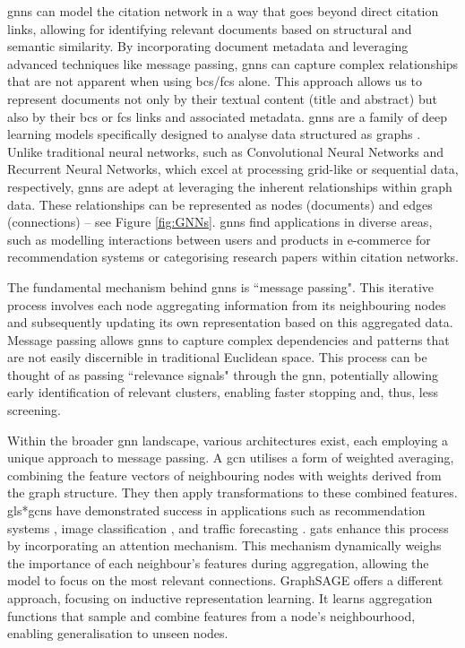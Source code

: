 \documentclass[10pt,oneside]{book}
\begin{document}
\gls*{gnn}s can model the citation network in a way that goes beyond direct citation links, allowing for identifying relevant documents based on structural and semantic similarity. By incorporating document metadata and leveraging advanced techniques like message passing, \gls*{gnn}s can capture complex relationships that are not apparent when using \gls*{bcs}/\gls*{fcs} alone. This approach allows us to represent documents not only by their textual content (title and abstract) but also by their \gls*{bcs} or \gls*{fcs} links and associated metadata. \gls*{gnn}s are a family of deep learning models specifically designed to analyse data structured as graphs \cite{lee_attention_2018, wu_comprehensive_2021, bronstein_geometric_2017, khemani_review_2024}. Unlike traditional neural networks, such as Convolutional Neural Networks and Recurrent Neural Networks, which excel at processing grid-like or sequential data, respectively, \gls*{gnn}s are adept at leveraging the inherent relationships within graph data. These relationships can be represented as nodes (documents) and edges (connections) – see Figure \ref{fig:GNNs}. \gls*{gnn}s find applications in diverse areas, such as modelling interactions between users and products in e-commerce for recommendation systems or categorising research papers within citation networks. 

The fundamental mechanism behind \gls*{gnn}s is ``message passing". This iterative process involves each node aggregating information from its neighbouring nodes and subsequently updating its own representation based on this aggregated data. Message passing allows \gls*{gnn}s to capture complex dependencies and patterns that are not easily discernible in traditional Euclidean space. This process can be thought of as passing ``relevance signals" through the \gls*{gnn}, potentially allowing early identification of relevant clusters, enabling faster stopping and, thus, less screening.

Within the broader \gls*{gnn} landscape, various architectures exist, each employing a unique approach to message passing. A \gls*{gcn} \cite{berg_graph_2017} utilises a form of weighted averaging, combining the feature vectors of neighbouring nodes with weights derived from the graph structure. They then apply transformations to these combined features. gls*{gcn}s have demonstrated success in applications such as recommendation systems \cite{fan_graph_2019}, image classification \cite{monti_geometric_2016}, and traffic forecasting \cite{cui_traffic_2020}. \gls*{gats} enhance this process by incorporating an attention mechanism. This mechanism dynamically weighs the importance of each neighbour's features during aggregation, allowing the model to focus on the most relevant connections. GraphSAGE offers a different approach, focusing on inductive representation learning. It learns aggregation functions that sample and combine features from a node's neighbourhood, enabling generalisation to unseen nodes. 
\end{document}
